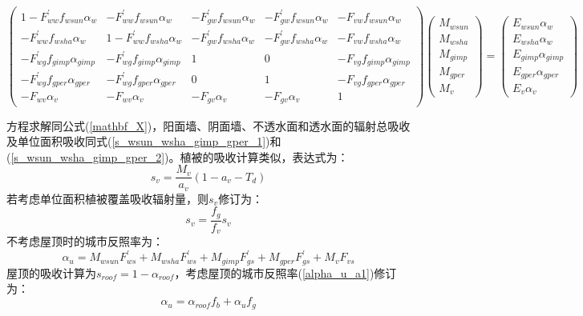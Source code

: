 \begin{landscape}
\begin{equation}
\left(\begin{array}{ccccc}1-F_{ww}^{\prime} f_{wsun} \alpha_{w} & -F_{ww}^{\prime} f_{wsun} \alpha_{w} & -F_{g w}^{\prime} f_{wsun} \alpha_{w} & -F_{g w}^{\prime} f_{wsun} \alpha_{w} & -F_{v w} f_{wsun} \alpha_{w} \\ -F_{ww}^{\prime} f_{wsha} \alpha_{w} & 1-F_{ww}^{\prime} f_{wsha} \alpha_{w} & -F_{g w}^{\prime} f_{wsha} \alpha_{w} & -F_{g w}^{\prime} f_{wsha} \alpha_{w} & -F_{v w} f_{wsha} \alpha_{w} \\ -F_{w g}^{\prime} f_{gimp} \alpha_{gimp} & -F_{w g}^{\prime} f_{gimp} \alpha_{gimp} & 1 & 0 & -F_{v g} f_{gimp} \alpha_{gimp} \\ -F_{w g}^{\prime} f_{gper} \alpha_{gper} & -F_{w g}^{\prime} f_{gper} \alpha_{gper} & 0 & 1 & -F_{v g} f_{gper} \alpha_{gper} \\ -F_{w v} \alpha_{v} & -F_{w v} \alpha_{v} & -F_{g v} \alpha_{v} & -F_{g v} \alpha_{v} & 1\end{array}\right)\left(\begin{array}{c}M_{wsun} \\ M_{wsha} \\ M_{gimp} \\ M_{gper} \\ M_{v}\end{array}\right)=\left(\begin{array}{c}E_{wsun} \alpha_{w} \\ E_{wsha} \alpha_{w} \\ E_{gimp} \alpha_{gimp} \\ E_{gper} \alpha_{gper} \\ E_{v} \alpha_{v}\end{array}\right)
\end{equation}
\end{landscape}
方程求解同公式(\ref{mathbf_X})，阳面墙、阴面墙、不透水面和透水面的辐射总吸收及单位面积吸收同式(\ref{s_wsun_wsha_gimp_gper_1})和(\ref{s_wsun_wsha_gimp_gper_2})。植被的吸收计算类似，表达式为：
\begin{equation}
s_{v}=\frac{M_{v}}{a_{v}}\left(1-a_{v}-T_{d}\right)
\end{equation}
若考虑单位面积植被覆盖吸收辐射量，则$s_v$修订为：
\begin{equation}
s_{v}=\frac{f_{g}}{f_{v}} s_{v}
\end{equation}
不考虑屋顶时的城市反照率为：
\begin{equation}\label{alpha_u_a1}
\alpha_{u}=M_{wsun} F_{ws}^{\prime}+M_{wsha} F_{ws}^{\prime}+M_{gimp} F_{gs}^{\prime}+M_{gper} F_{gs}^{\prime}+M_{v} F_{v s}
\end{equation}
屋顶的吸收计算为$s_{roof}=1-\alpha_{roof}$，考虑屋顶的城市反照率(\ref{alpha_u_a1})修订为：
\begin{equation}
\alpha_{u}=\alpha_{roof} f_{b}+\alpha_{u} f_{g}
\end{equation}

